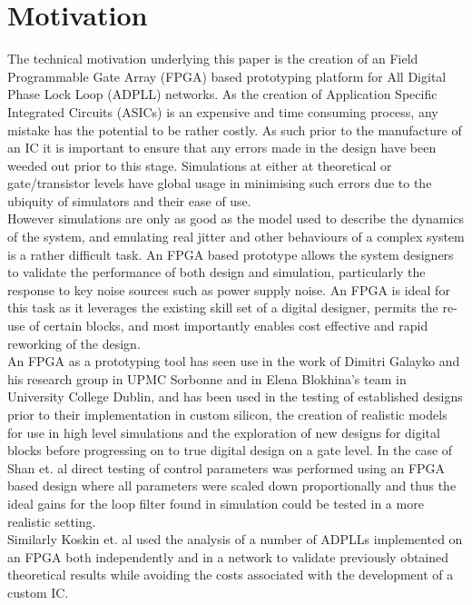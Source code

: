 \documentclass[conference]{IEEEtran}
\begin{document}
\section{Motivation}
The technical motivation underlying this paper is the creation of an Field Programmable Gate Array (FPGA) based prototyping platform for All Digital Phase Lock Loop (ADPLL) networks. As the creation of Application Specific Integrated Circuits (ASICs) is an expensive and time consuming process, any mistake has the potential to be rather costly. As such prior to the manufacture of an IC it is important to ensure that any errors made in the design have been weeded out prior to this stage.
Simulations at either at theoretical or gate/transistor levels have global usage in minimising such errors due to the ubiquity of simulators and their ease of use.\\
However simulations are only as good as the model used to describe the dynamics of the system, and emulating real jitter and other behaviours of a complex system is a rather difficult task. %
An FPGA based prototype allows the system designers to validate the performance of both design and simulation, particularly the response to key noise sources such as power supply noise. An FPGA is ideal for this task as it leverages the existing skill set of a digital designer, permits the re-use of certain blocks, and most importantly enables cost effective and rapid reworking of the design.\\
An FPGA as a prototyping tool has seen use in the work of Dimitri Galayko and his research group in UPMC Sorbonne and in Elena Blokhina's team in University College Dublin, and has been used in the testing of established designs prior to their implementation in custom silicon\cite{zianbetov2013phd,shan2014phd}, the creation of realistic models for use in high level simulations\cite{theboys2019} and the exploration of new designs for digital blocks before progressing on to true digital design on a gate level.  %
In the case of Shan et. al \cite{shan2014phd} direct testing of control parameters was performed using an FPGA based design where all parameters were scaled down proportionally and thus the ideal gains for the loop filter found in simulation could be tested in a more realistic setting.\\
Similarly Koskin et. al \cite{theboys2019} used the analysis of a number of ADPLLs implemented on an FPGA both independently and in a network to validate previously obtained theoretical results while avoiding the costs associated with the development of a custom IC.\\
\end{document}
